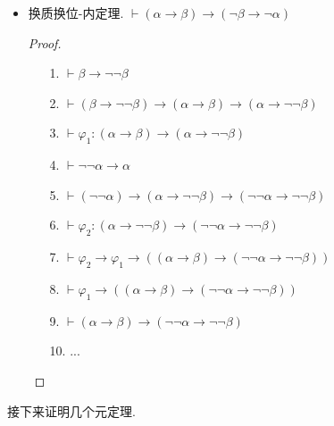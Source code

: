 \documentclass[main.tex]{subfiles}
\begin{document}
\begin{itemize}
    \item 换质换位-内定理. \(\vdash (\alpha \to \beta) \to (\neg \beta \to \neg \alpha)\)
    \begin{proof}
        \begin{itemize}
            \item [1.] \(\vdash \beta \to \neg \neg \beta\)
            \item [2.] \(\vdash (\beta \to \neg \neg \beta) \to (\alpha \to \beta) \to (\alpha \to \neg \neg \beta)\)
            \item [3.] \(\vdash \varphi_1: (\alpha \to \beta) \to (\alpha \to \neg \neg \beta)\)
            \item [4.] \(\vdash \neg \neg \alpha \to \alpha\)
            \item [5.] \(\vdash (\neg \neg \alpha) \to (\alpha \to \neg \neg \beta) \to (\neg \neg \alpha \to \neg \neg \beta)\)
            \item [6.] \(\vdash \varphi_2: (\alpha \to \neg \neg \beta) \to (\neg \neg \alpha \to \neg \neg \beta)\)
            \item [7.] \(\vdash \varphi_2 \to \varphi_1 \to ((\alpha \to \beta) \to (\neg \neg \alpha \to \neg \neg \beta))\)
            \item [8.] \(\vdash \varphi_1 \to ((\alpha \to \beta) \to (\neg \neg \alpha \to \neg \neg \beta))\)
            \item [9.] \(\vdash (\alpha \to \beta) \to (\neg \neg \alpha \to \neg \neg \beta)\)
            \item [10.] ...
        \end{itemize}
    \end{proof}
    
\end{itemize}

接下来证明几个元定理.
\end{document}
